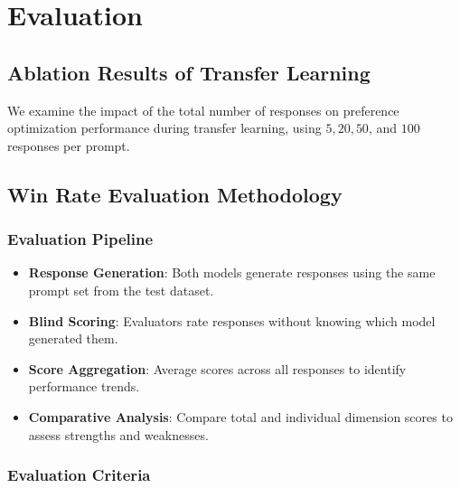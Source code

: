 \section{Evaluation}
\subsection{Ablation Results of Transfer Learning}
% 


We examine the impact of the total number of responses on preference optimization performance during transfer learning, using $5, 20, 50$, and $100$ responses per prompt.


\subsection{Win Rate Evaluation Methodology}  
\label{winratepipeline}  

\subsubsection{Evaluation Pipeline}  

\begin{itemize}  
  \item \textbf{Response Generation}: Both models generate responses using the same prompt set from the test dataset.  
  \item \textbf{Blind Scoring}: Evaluators rate responses without knowing which model generated them.  
  \item \textbf{Score Aggregation}: Average scores across all responses to identify performance trends.  
  \item \textbf{Comparative Analysis}: Compare total and individual dimension scores to assess strengths and weaknesses.  
\end{itemize}  

\subsubsection{Evaluation Criteria}  

